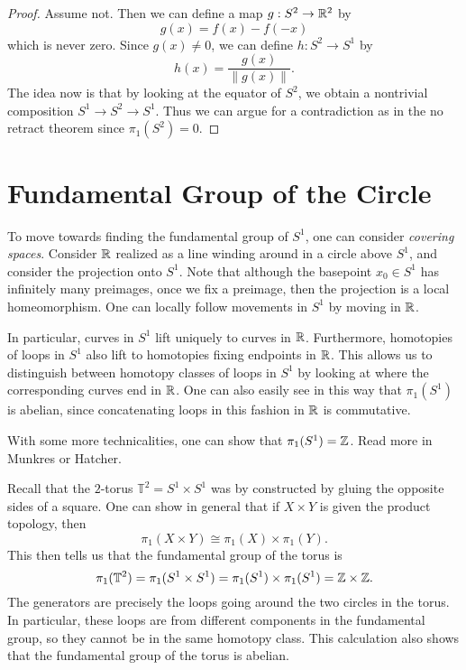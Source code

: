 \begin{proof}
  Assume not. Then we can define a map
  $g : S^2 \to \mathbb{R}^2$ by
  \[
    g(x) = f(x) - f(-x)
  \]
  which is never zero. Since $g(x) \ne 0$, we can
  define $h : S^2 \to S^1$ by
  \[
    h(x) = \frac{g(x)}{\|g(x)\|}.
  \]
  The idea now is that by looking at the equator
  of $S^2$, we obtain a nontrivial composition
  $S^1 \to S^2 \to S^1$. Thus we can argue for
  a contradiction as in the
  no retract theorem since $\pi_1(S^2) = 0$.
\end{proof}

\section{Fundamental Group of the Circle}

\begin{remark}
  To move towards finding the fundamental group of
  $S^1$, one can consider \emph{covering spaces}.
  Consider $\mathbb{R}$ realized as a line winding
  around in a circle above $S^1$, and consider
  the projection onto $S^1$. Note that although the
  basepoint $x_0 \in S^1$ has infinitely many
  preimages, once we fix a preimage, then
  the projection is a local homeomorphism.
  One can locally follow movements in $S^1$
  by moving in $\mathbb{R}$.

  In particular, curves in $S^1$ lift uniquely
  to curves
  in $\mathbb{R}$. Furthermore, homotopies of loops in $S^1$
  also lift to homotopies fixing endpoints in $\mathbb{R}$.
  This allows
  us to distinguish between homotopy classes
  of loops in $S^1$ by looking at where the
  corresponding curves end in $\mathbb{R}$. One can also
  easily see in this way that $\pi_1(S^1)$ is
  abelian, since concatenating loops in this
  fashion in $\mathbb{R}$ is commutative.

  With some more technicalities, one can show
  that $\pi_1(S^1) = \mathbb{Z}$. Read more in Munkres
  or Hatcher.
\end{remark}

\begin{example}
  Recall that the $2$-torus
  $\mathbb{T}^2 = S^1 \times S^1$ was by
  constructed by gluing the opposite sides of a
  square. One can show in general that
  if $X \times Y$ is given the product topology, then
  \[
    \pi_1(X \times Y) \cong \pi_1(X) \times \pi_1(Y).
  \]
  This then tells us that
  the fundamental group of the torus is
  \[
    \pi_1(\mathbb{T}^2) = \pi_1(S^1 \times S^1)
    = \pi_1(S^1) \times \pi_1(S^1) = \mathbb{Z} \times \mathbb{Z}.
  \]
  The generators are precisely the loops going
  around the two circles in the torus. In particular,
  these loops are from different
  components in the fundamental group, so
  they cannot be in the same homotopy class.
  This calculation
  also shows that the fundamental group of the
  torus is abelian.
\end{example}

